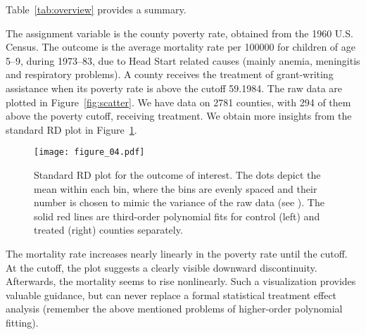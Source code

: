 Table~\ref{tab:overview} provides a summary.
\begin{table}
	\centering
	\label{tab:overview}
\end{table}
The assignment variable is the county poverty rate, obtained from the 1960 U.S. Census.
The outcome is the average mortality rate per 100000 for children of age 5--9, during 1973--83,
due to Head Start related causes (mainly anemia, meningitis and respiratory problems).
A county receives the treatment of grant-writing assistance when its poverty rate is above the cutoff 59.1984.
The raw data are plotted in Figure~\ref{fig:scatter}.
We have data on 2781 counties, with 294 of them above the poverty cutoff, receiving treatment.
We obtain more insights from the standard RD plot in Figure~\ref{fig:rdplot_Y}.
\begin{figure}
	\centering
	\texttt{[image: figure\_04.pdf]}
	\caption{Standard RD plot for the outcome of interest.
			 The dots depict the mean within each bin, where the bins are evenly spaced and their number is chosen to mimic the variance of the raw data (see \cite{Calonico_2015a}).
		 	 The solid red lines are third-order polynomial fits for control (left) and treated (right) counties separately.}
	\label{fig:rdplot_Y}
\end{figure}
The mortality rate increases nearly linearly in the poverty rate until the cutoff.
At the cutoff, the plot suggests a clearly visible downward discontinuity.
Afterwards, the mortality seems to rise nonlinearly.
Such a visualization provides valuable guidance, but can never replace a formal statistical treatment effect analysis
(remember the above mentioned problems of higher-order polynomial fitting).

